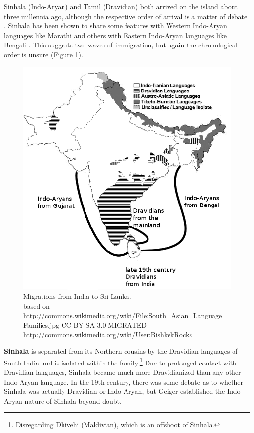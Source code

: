 \documentclass{article}
\begin{document}
Sinhala (Indo-Aryan) and Tamil (Dravidian) both arrived on the island about three millennia ago, although the respective order of arrival is a matter of debate \citep[4]{Gair1998}. Sinhala has been shown to share some features with Western Indo-Aryan languages like Marathi and others with Eastern Indo-Aryan languages like Bengali \citep{Geiger1973}. This suggests two waves of immigration, but again the chronological order is unsure (Figure \ref{fig:migrationISL}). 



\begin{figure}
\begin{center}
 \includegraphics[height=.4\textheight]{insl2.png}
\end{center}
 \caption{Migrations from India to Sri Lanka. \\{\tiny based on http://commons.wikimedia.org/wiki/File:South_Asian_Language_Families.jpg CC-BY-SA-3.0-MIGRATED http://commons.wikimedia.org/wiki/User:BishkekRocks}}
\label{fig:migrationISL}
\end{figure}


\textbf{Sinhala} is separated from its Northern cousins by the Dravidian languages of South India and is isolated within the family.\footnote{Disregarding
 Dhivehi (Maldivian), which is an offshoot of Sinhala.
}
Due to prolonged contact with Dravidian languages, Sinhala became much more Dravidianized than any other Indo-Aryan language. 
In the 19th century, there was some debate as to whether Sinhala was actually Dravidian or Indo-Aryan, but Geiger established the Indo-Aryan nature of Sinhala beyond doubt. 
\end{document}
